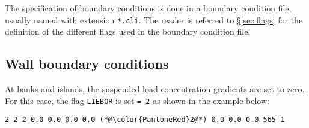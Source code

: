 The specification of boundary conditions is done in a boundary condition file, usually named with extension \texttt{*.cli}. The reader is referred to \S\ref{sec:flags} for the definition of the different flags used in the boundary condition file.

\subsection{Wall boundary conditions}
At banks and islands, the suspended load concentration gradients are set to zero. For this case, the flag \texttt{LIEBOR} is set \texttt{= 2} as shown in the example below:

\begin{lstlisting}[frame=trBL]
2 2 2 0.0 0.0 0.0 0.0 (*@\color{PantoneRed}2@*) 0.0 0.0 0.0 565 1
\end{lstlisting}

